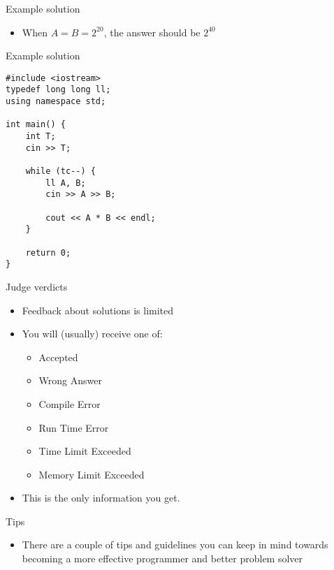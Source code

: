 \documentclass[12pt,t]{beamer}
\newcommand{\bi}{\begin{itemize}}
\newcommand{\ei}{\end{itemize}}
\begin{document}
\begin{frame}[fragile]{Example solution}
    \vspace{40pt}
    \bi
        \item When $A = B = 2^{20}$, the answer should be $2^{40}$
    \ei
\end{frame}

\begin{frame}[fragile]{Example solution}
    \begin{verbatim}
#include <iostream>
typedef long long ll;
using namespace std;

int main() {
    int T;
    cin >> T;

    while (tc--) {
        ll A, B;
        cin >> A >> B;

        cout << A * B << endl;
    }

    return 0;
}
\end{verbatim}

    \bi
    \ei
\end{frame}

\begin{frame}{Judge verdicts}
    \bi
        \item Feedback about solutions is limited
        \item You will (usually) receive one of:
            \bi
                \item Accepted
                \item Wrong Answer
                \item Compile Error
                \item Run Time Error
                \item Time Limit Exceeded
                \item Memory Limit Exceeded
            \ei

        \item This is the only information you get.
    \ei
\end{frame}

\begin{frame}{Tips}
    \bi
        \item There are a couple of tips and guidelines you can keep in mind towards becoming a more effective programmer and better problem solver

    \ei
\end{frame}
\end{document}
